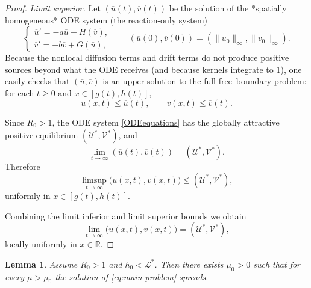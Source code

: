 \documentclass[a4paper,11pt]{amsart}
\newtheorem{lemma}[theorem]{Lemma}
\theoremstyle{definition}
\numberwithin{equation}{section}
\theoremstyle{definition}
\begin{document}
\begin{proof}
\emph{Limit superior.} Let \((\overline u(t),\overline v(t))\) be the solution of the *spatially homogeneous* ODE system (the reaction-only system)
\begin{equation}\label{ODEequations}
\begin{cases}
\overline u' = -a\overline u + H(\overline v),\\
\overline v' = -b\overline v + G(\overline u),
\end{cases}
\qquad
(\overline u(0),\overline v(0))=(\|u_0\|_\infty,\|v_0\|_\infty).
\end{equation}
Because the nonlocal diffusion terms and drift terms do not produce positive sources beyond what the ODE receives (and because kernels integrate to \(1\)), one easily checks that \((\overline u,\overline v)\) is an upper solution to the full free–boundary problem: for each \(t\geq0\) and \(x\in[g(t),h(t)]\),
\[
u(x,t)\leq \overline u(t),\qquad v(x,t)\leq \overline v(t).
\]


Since \(R_0>1\), the ODE system \eqref{ODEequations} has the globally attractive positive equilibrium \((\mathscr U^\ast,\mathscr V^\ast)\), and
\[
\lim_{t\to\infty}(\overline u(t),\overline v(t))=(\mathscr U^\ast,\mathscr V^\ast).
\]
Therefore
\[
\limsup_{t\to\infty}\bigl(u(x,t),v(x,t)\bigr) \leq (\mathscr U^\ast,\mathscr V^\ast),
\]
uniformly in \(x\in[g(t),h(t)]\).

\medskip\noindent Combining the limit inferior and limit superior bounds we obtain
\[
\lim_{t\to\infty}\bigl(u(x,t),v(x,t)\bigr)=(\mathscr U^\ast,\mathscr V^\ast),
\]
locally uniformly in \(x\in\mathbb R\).
\end{proof}

\begin{lemma}\label{lem:mu-large-spreading}
Assume $R_0>1$ and $h_0<\mathcal L^\ast$. Then there exists $\mu_0>0$ such that for every $\mu>\mu_0$ the solution of \eqref{eq:main-problem} spreads.
\end{lemma}
\end{document}
